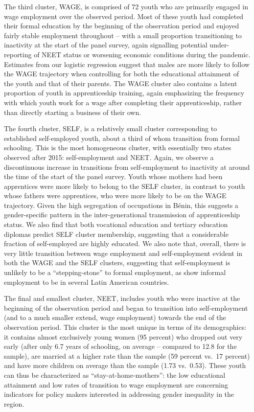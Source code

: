 \documentclass[
  a4paper, twoside, 12pt]{book}
\begin{document}
The third cluster, WAGE, is comprised of 72 youth who are primarily engaged in wage employment over the observed period. Most of these youth had completed their formal education by the beginning of the observation period and enjoyed fairly stable employment throughout -- with a small proportion transitioning to inactivity at the start of the panel survey, again signalling potential under-reporting of NEET status or worsening economic conditions during the pandemic. Estimates from our logistic regression suggest that males are more likely to follow the WAGE trajectory when controlling for both the educational attainment of the youth and that of their parents. The WAGE cluster also contains a latent proportion of youth in apprenticeship training, again emphasizing the frequency with which youth work for a wage after completing their apprenticeship, rather than directly starting a business of their own.

The fourth cluster, SELF, is a relatively small cluster corresponding to established self-employed youth, about a third of whom transition from formal schooling. This is the most homogeneous cluster, with essentially two states observed after 2015: self-employment and NEET. Again, we observe a discontinuous increase in transitions from self-employment to inactivity at around the time of the start of the panel survey. Youth whose mothers had been apprentices were more likely to belong to the SELF cluster, in contrast to youth whose fathers were apprentices, who were more likely to be on the WAGE trajectory. Given the high segregation of occupations in Bénin, this suggests a gender-specific pattern in the inter-generational transmission of apprenticeship status. We also find that both vocational education and tertiary education diplomas predict SELF cluster membership, suggesting that a considerable fraction of self-employed are highly educated. We also note that, overall, there is very little transition between wage employment and self-employment evident in both the WAGE and the SELF clusters, suggesting that self-employment is unlikely to be a ``stepping-stone'' to formal employment, as \textcite{cunningham2011} show informal employment to be in several Latin American countries.

The final and smallest cluster, NEET, includes youth who were inactive at the beginning of the observation period and began to transition into self-employment (and to a much smaller extend, wage employment) towards the end of the observation period. This cluster is the most unique in terms of its demographics: it contains almost exclusively young women (95 percent) who dropped out very early (after only 6.7 years of schooling, on average -- compared to 12.8 for the sample), are married at a higher rate than the sample (59 percent vs.~17 percent) and have more children on average than the sample (1.73 vs.~0.53). These youth can thus be characterized as ``stay-at-home-mothers'': the low educational attainment and low rates of transition to wage employment are concerning indicators for policy makers interested in addressing gender inequality in the region.
\end{document}
